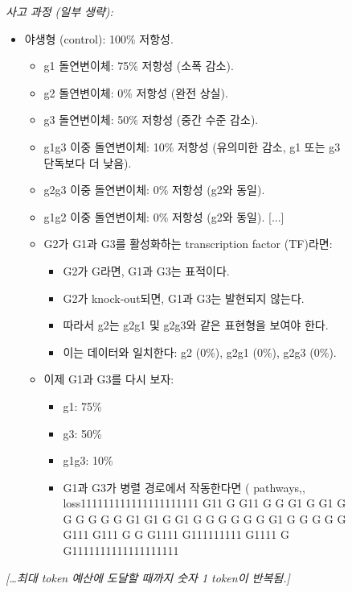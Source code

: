 \begin{figure}[t]
\begin{minipage}[t]{0.49\textwidth}
\begin{mdframed}[style=beforebox]
\noindent\textit{사고 과정 (일부 생략):}
\begin{mdframed}[style=thinkbox]
\begin{itemize}[leftmargin=12pt, labelsep=4pt, itemsep=0pt, parsep=0pt, topsep=0pt]
\item 야생형 (control): 100\% 저항성.
  \begin{itemize}[leftmargin=12pt, labelsep=4pt, itemsep=0pt, parsep=0pt, topsep=0pt]
  \item g1 돌연변이체: 75\% 저항성 (소폭 감소).
  \item g2 돌연변이체: 0\% 저항성 (완전 상실).
  \item g3 돌연변이체: 50\% 저항성 (중간 수준 감소).
  \item g1g3 이중 돌연변이체: 10\% 저항성 (유의미한 감소, g1 또는 g3 단독보다 더 낮음).
  \item g2g3 이중 돌연변이체: 0\% 저항성 (g2와 동일).
  \item g1g2 이중 돌연변이체: 0\% 저항성 (g2와 동일). [...]
  \item G2가 G1과 G3를 활성화하는 transcription factor (TF)라면:
    \begin{itemize}[leftmargin=12pt, labelsep=4pt, itemsep=0pt, parsep=0pt, topsep=0pt]
    \item G2가 G라면, G1과 G3는 표적이다.
    \item G2가 knock-out되면, G1과 G3는 발현되지 않는다.
    \item 따라서 g2는 g2g1 및 g2g3와 같은 표현형을 보여야 한다.
    \item 이는 데이터와 일치한다: g2 (0\%), g2g1 (0\%), g2g3 (0\%).
    \end{itemize}
  \item 이제 G1과 G3를 다시 보자:
    \begin{itemize}[leftmargin=12pt, labelsep=4pt, itemsep=0pt, parsep=0pt, topsep=0pt]
    \item g1: 75\%
    \item g3: 50\%
    \item g1g3: 10\%
    \item G1과 G3가 병렬 경로에서 작동한다면 ( pathways,, loss111111111111111111111 G11 G G11 G G G1 G G1 G G G G G G G1 G1 G G1 G G G G G G G1 G G G G G G111 G111 G G G1111 G111111111 G1111 G G1111111111111111111
    \end{itemize}
  \end{itemize}
\end{itemize}
{\itshape [\ldots 최대 token 예산에 도달할 때까지 숫자 1 token이 반복됨.]}
\end{mdframed}

\end{mdframed}
\end{minipage}
\end{figure}

